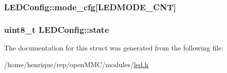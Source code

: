 \hypertarget{structLEDConfig_a0aa000270a9a88e48df73491ec48c265}{
\subsubsection[{mode\-\_\-cfg}]{ L\-E\-D\-Config\-::mode\-\_\-cfg\mbox{[}{\bf L\-E\-D\-M\-O\-D\-E\-\_\-\-C\-N\-T}\mbox{]}}}\label{structLEDConfig_a0aa000270a9a88e48df73491ec48c265}
\hypertarget{structLEDConfig_a79c1d3ad1b2afb9182a988dfc11480a3}{
\subsubsection[{state}]{\setlength{\rightskip}{0pt plus 5cm}uint8\-\_\-t L\-E\-D\-Config\-::state}}\label{structLEDConfig_a79c1d3ad1b2afb9182a988dfc11480a3}


The documentation for this struct was generated from the following file\-:\begin{DoxyCompactItemize}
\item 
/home/henrique/rep/open\-M\-M\-C/modules/\hyperlink{led_8h}{led.\-h}\end{DoxyCompactItemize}
